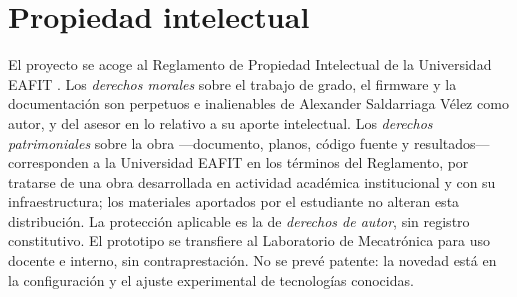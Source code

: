 \section{Propiedad intelectual}

El proyecto se acoge al Reglamento de Propiedad Intelectual de la Universidad EAFIT \cite{eafit_pi}. Los \emph{derechos morales} sobre el trabajo de grado, el firmware y la documentación son perpetuos e inalienables de Alexander Saldarriaga Vélez como autor, y del asesor en lo relativo a su aporte intelectual. Los \emph{derechos patrimoniales} sobre la obra —documento, planos, código fuente y resultados— corresponden a la Universidad EAFIT en los términos del Reglamento, por tratarse de una obra desarrollada en actividad académica institucional y con su infraestructura; los materiales aportados por el estudiante no alteran esta distribución. La protección aplicable es la de \emph{derechos de autor}, sin registro constitutivo. El prototipo se transfiere al Laboratorio de Mecatrónica para uso docente e interno, sin contraprestación. No se prevé patente: la novedad está en la configuración y el ajuste experimental de tecnologías conocidas.

